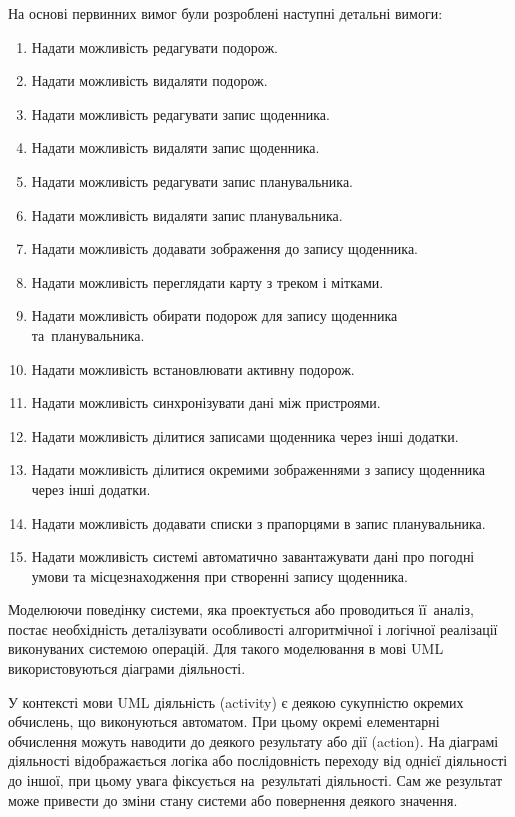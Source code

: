 \documentclass[../main.tex]{subfiles}
\begin{document}
На основі первинних вимог були розроблені наступні детальні вимоги:
\begin{enumerate}
	\item Надати можливість редагувати подорож.
	\item Надати можливість видаляти подорож.
	\item Надати можливість редагувати запис щоденника.
	\item Надати можливість видаляти запис щоденника.
	\item Надати можливість редагувати запис планувальника.
	\item Надати можливість видаляти запис планувальника.
	\item Надати можливість додавати зображення до запису щоденника.
	\item Надати можливість переглядати карту з треком і мітками.
	\item Надати можливість обирати подорож для запису щоденника та~планувальника.
	\item Надати можливість встановлювати активну подорож.
	\item Надати можливість синхронізувати дані між пристроями.
	\item Надати можливість ділитися записами щоденника через інші додатки.
	\item Надати можливість ділитися окремими зображеннями з запису щоденника через інші додатки.
	\item Надати можливість додавати списки з прапорцями в запис планувальника.
	\item Надати можливість системі автоматично завантажувати дані про погодні умови та місцезнаходження при створенні запису щоденника.
\end{enumerate}

Моделюючи поведінку системи, яка проектується або проводиться її~аналіз, постає необхідність деталізувати особливості алгоритмічної і логічної реалізації виконуваних системою операцій. Для такого моделювання в мові UML використовуються діаграми діяльності.

У контексті мови UML діяльність (activity) є деякою сукупністю окремих обчислень, що виконуються автоматом. При цьому окремі елементарні обчислення можуть наводити до деякого результату або дії (action). На діаграмі діяльності відображається логіка або послідовність переходу від однієї діяльності до іншої, при цьому увага фіксується на~результаті діяльності. Сам же результат може привести до зміни стану системи або повернення деякого значення.
\end{document}
